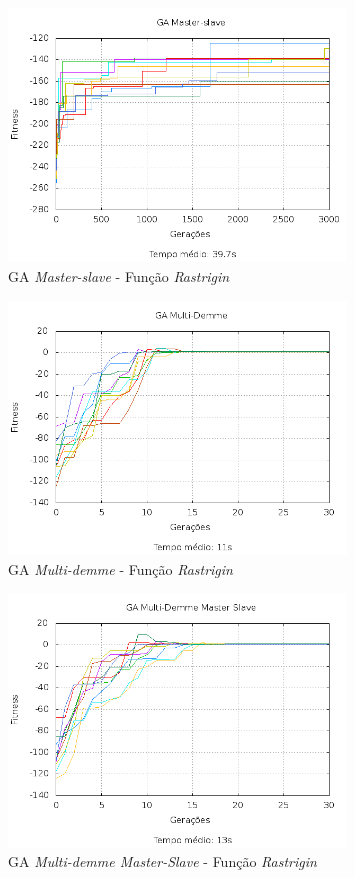 \documentclass[12pt]{article}
\begin{document}
\begin{figure}[hp]
  \centering
  \includegraphics[width=0.8\textwidth]{ms_f3.png}
  \caption{GA \emph{Master-slave} - Função \emph{Rastrigin}}
\end{figure}

\begin{figure}[hp]
  \centering
  \includegraphics[width=0.8\textwidth]{md_f3.png}
  \caption{GA \emph{Multi-demme} - Função \emph{Rastrigin}}
\end{figure}

\begin{figure}[hp]
  \centering
  \includegraphics[width=0.8\textwidth]{mdms_f3.png}
  \caption{GA \emph{Multi-demme Master-Slave} - Função \emph{Rastrigin}}
\end{figure}
\end{document}
